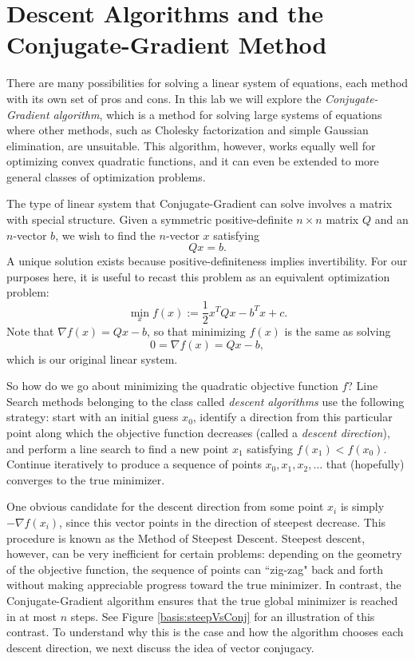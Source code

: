 
\section*{Descent Algorithms and the Conjugate-Gradient Method}
There are many possibilities for solving a linear system of equations, each method with its own set of pros and cons. In this lab we
will explore the \emph{Conjugate-Gradient algorithm}, which is a method for solving large systems of equations where other methods,
such as Cholesky factorization and simple Gaussian elimination, are unsuitable. This algorithm, however, works equally well for
optimizing convex quadratic functions, and it can even be extended to more general classes of optimization problems.

The type of linear system that Conjugate-Gradient can solve involves a matrix with special structure.
Given a symmetric positive-definite $n\times n$ matrix $Q$ and an $n$-vector $b$, we wish to find the $n$-vector $x$ satisfying
\[
Qx = b.
\]
A unique solution exists because positive-definiteness implies invertibility.
For our purposes here, it is useful to recast this problem as an equivalent optimization problem:
\[
\min_{x} f(x) := \frac{1}{2}x^TQx - b^Tx + c.
\]
Note that $\nabla f(x) = Qx - b$, so that minimizing $f(x)$ is the same as solving
\[
0 = \nabla f(x) = Qx - b,
\]
which is our original linear system.

So how do we go about minimizing the quadratic objective function $f$? Line Search methods belonging to the class called
\emph{descent algorithms} use the following strategy: start with an initial guess $x_0$, identify a direction from
this particular point along which the objective function decreases (called a \emph{descent direction}), and perform a line search to
find a new point $x_1$ satisfying $f(x_1) < f(x_0)$. Continue iteratively to produce a sequence of points $x_0, x_1, x_2, \ldots$
that (hopefully) converges to the true minimizer.

One obvious candidate for the descent direction from some point $x_i$ is simply
$-\nabla f(x_i)$, since this vector points in the direction of steepest decrease. This procedure is known as the Method of Steepest
Descent. Steepest descent, however, can be very inefficient for certain problems: depending on the geometry
of the objective function, the sequence of points can ``zig-zag" back and forth without making appreciable progress toward the true
minimizer. In contrast, the Conjugate-Gradient algorithm ensures that the true global minimizer is reached in at most $n$ steps. See
Figure \ref{basis:steepVsConj} for an illustration of this contrast.
To understand why this is the case and how the algorithm chooses each descent direction, we next discuss the idea of vector conjugacy.

